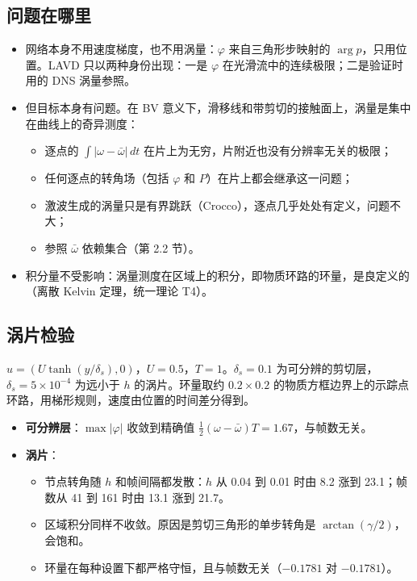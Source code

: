 \documentclass[10.5pt,a4paper]{article}
\newcommand{\keyp}[1]{\textbf{\sffamily #1}}
\theoremstyle{definition}
\theoremstyle{plain}
\theoremstyle{remark}
\begin{document}
\subsection{问题在哪里}
\begin{itemize}
\item 网络本身不用速度梯度，也不用涡量：$\varphi$ 来自三角形步映射的 $\arg p$，只用位置。LAVD 只以两种身份出现：一是 $\varphi$ 在光滑流中的连续极限；二是验证时用的 DNS 涡量参照。
\item 但目标本身有问题。在 BV 意义下，滑移线和带剪切的接触面上，涡量是集中在曲线上的奇异测度：
  \begin{itemize}[leftmargin=1.2em]
  \item 逐点的 $\int|\omega-\bar\omega|\,dt$ 在片上为无穷，片附近也没有分辨率无关的极限；
  \item 任何逐点的转角场（包括 $\varphi$ 和 $P$）在片上都会继承这一问题；
  \item 激波生成的涡量只是有界跳跃（Crocco），逐点几乎处处有定义，问题不大；
  \item 参照 $\bar\omega$ 依赖集合（第 2.2 节）。
  \end{itemize}
\item 积分量不受影响：涡量测度在区域上的积分，即物质环路的环量，是良定义的（离散 Kelvin 定理，统一理论 T4）。
\end{itemize}

\subsection{涡片检验}
$u=(U\tanh(y/\delta_s),0)$，$U=0.5$，$T=1$。$\delta_s=0.1$ 为可分辨的剪切层，$\delta_s=5\times10^{-4}$ 为远小于 $h$ 的涡片。环量取约 $0.2\times0.2$ 的物质方框边界上的示踪点环路，用梯形规则，速度由位置的时间差分得到。
\begin{table}[H]\centering\small\caption{剪切层与涡片上的逐点转角、区域积分与环路环量。}\resizebox{\linewidth}{!}{}\end{table}
\begin{itemize}
\item \keyp{可分辨层}：$\max|\varphi|$ 收敛到精确值 $\tfrac12(\omega-\bar\omega)T=1.67$，与帧数无关。
\item \keyp{涡片}：
  \begin{itemize}[leftmargin=1.2em]
  \item 节点转角随 $h$ 和帧间隔都发散：$h$ 从 0.04 到 0.01 时由 8.2 涨到 23.1；帧数从 41 到 161 时由 13.1 涨到 21.7。
  \item 区域积分同样不收敛。原因是剪切三角形的单步转角是 $\arctan(\gamma/2)$，会饱和。
  \item 环量在每种设置下都严格守恒，且与帧数无关（$-0.1781$ 对 $-0.1781$）。
  \end{itemize}
\end{itemize}
\end{document}
